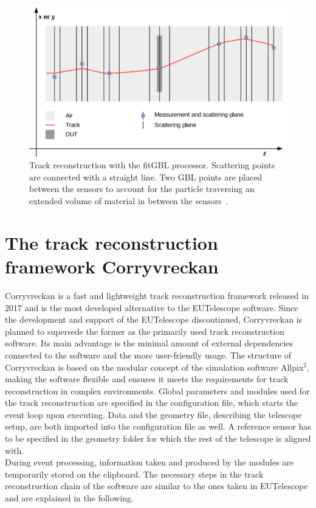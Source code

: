 \begin{figure}
  \centering
  \includegraphics[height=0.5\textwidth]{images/gbl.png}
  \caption{Track reconstruction with the fitGBL processor. Scattering points are connected with a straight line. Two GBL points are placed between the sensors
  to account for the particle traversing an extended volume of material in between the \mbox{sensors \cite{gbl}}.}
  \label{fig:gbl}
\end{figure}



\section{The track reconstruction framework Corryvreckan}
Corryvreckan is a fast and lightweight track reconstruction framework released in 2017 and is the most developed alternative to the EUTelescope software.
Since the development and support of the EUTelescope discontinued, Corryvreckan is planned to supersede the former as the primarily used track
reconstruction software. Its main advantage is the minimal amount of external dependencies connected to the software and the more user-friendly usage.
The structure of Corryvreckan is based on the modular concept of the simulation software Allpix$^2$,
making the software flexible and ensures it meets the requirements for track reconstruction in
complex environments. Global parameters and modules used for the track reconstruction are specified in the configuration file, which starts the event loop upon
executing. Data and the geometry file, describing the telescope setup, are both imported into the configuration file as well.
A reference sensor has to be specified in the geometry folder
for which the rest of the telescope is aligned with. \\
During event processing, information taken and produced by the modules are temporarily stored on the clipboard.
The necessary steps in the track reconstruction chain of the software are similar to the ones taken in EUTelescope and are explained in the following.

